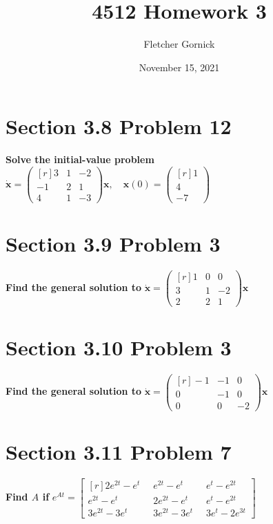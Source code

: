 \documentclass[11pt]{article}
\title{4512 Homework 3}
\author{Fletcher Gornick}
\date{November 15, 2021}
\begin{document}
 \maketitle 
 \section*{Section 3.8 Problem 12}
 \textbf{Solve the initial-value problem} \quad\quad
 $\boldsymbol{\dot x} = \begin{pmatrix*}[r] 3 & 1 & -2 \\ -1 & 2 & 1 \\ 4 & 1 & -3 \end{pmatrix*}
   \boldsymbol{x}, \quad \boldsymbol{x}(0) = \begin{pmatrix*}[r] 1 \\ 4 \\ -7 \end{pmatrix*}$

 \newpage

 \section*{Section 3.9 Problem 3}
 \textbf{Find the general solution to} \quad\quad
 $\boldsymbol{\dot x} = \begin{pmatrix*}[r] 1 & 0 & 0 \\ 3 & 1 & -2 \\ 2 & 2 & 1 \end{pmatrix*}
   \boldsymbol{x}$

 \newpage

 \section*{Section 3.10 Problem 3}
 \textbf{Find the general solution to} \quad\quad
 $\boldsymbol{\dot x} = \begin{pmatrix*}[r] -1 & -1 & 0 \\ 0 & -1 & 0 \\ 0 & 0 & -2 \end{pmatrix*}
   \boldsymbol{x}$

 \newpage

 \section*{Section 3.11 Problem 7}
 \textbf{Find $A$ if} \quad\quad
 $e^{At} = 
 \begin{bmatrix*}[r] 2e^{2t}-e^t \;\; & e^{2t}-e^t \;\; & e^t-e^{2t} \\
                                 e^{2t}-e^t \;\; & 2e^{2t}-e^t \;\; & e^t-e^{2t} \\
                                 3e^{2t}-3e^t \;\; & 3e^{2t}-3e^t \;\; & 3e^t-2e^{3t}
 \end{bmatrix*}$
\end{document}
